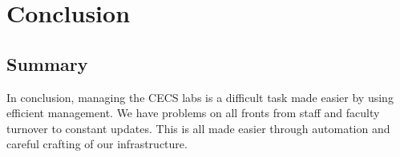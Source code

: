 \chapter{Conclusion} \label{ch:conclusion}
\section{Summary} \label{sec:summary}
In conclusion, managing the CECS labs is a difficult task made easier by using efficient management. We have problems on all fronts from staff and faculty turnover to constant updates. This is all made easier through automation and careful crafting of our infrastructure. 


